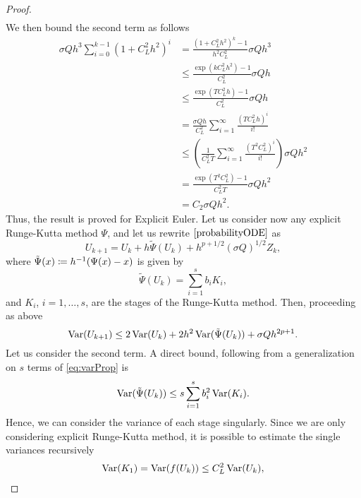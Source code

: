\begin{proof}
\begin{equation}
\begin{aligned}
\end{aligned}
\end{equation}
We then bound the second term as follows
\begin{equation}\label{eq:boundOfSum}
\begin{aligned}
	\sigma Q h^3 \sum_{i = 0}^{k - 1}(1 + C_L^2h^2)^i &=  \frac{(1 + C_L^2h^2)^k - 1}{h^2C_L^2}\sigma Qh^3 \\
	&\leq  \frac{\exp(kC_L^2h^2) - 1}{C_L^2}\sigma Qh \\ 
	&\leq  \frac{\exp(TC_L^2h) - 1}{C_L^2}\sigma Qh \\
	&= \frac{\sigma Qh}{C_L^2} \sum_{i = 1}^{\infty} \frac{(TC_L^2h)^i}{i!} \\
	&\leq \left(\frac{1}{C_L^2T} \sum_{i = 1}^{\infty} \frac{(T^2C_L^2)^i}{i!}\right)\sigma Q h^2 \\
	&= \frac{\exp(T^2C_L^2) - 1}{C_L^2T} \sigma Q h^2 \\
	&= C_2 \sigma Q h^2.
\end{aligned}
\end{equation}
Thus, the result is proved for Explicit Euler. Let us consider now any explicit Runge-Kutta method $\Psi$, and let us rewrite $\eqref{probabilityODE}$ as
\begin{equation}
	U_{k+1} = U_k + h\tilde \Psi (U_k) + h^{p + 1/2} (\sigma Q)^{1/2} Z_k,
\end{equation}
where $\tilde\Psi(x) \coloneqq h^{-1}(\Psi(x) - x)$ is given by
\begin{equation}
	\tilde\Psi(U_k) = \sum_{i = 1}^{s} b_i K_i,
\end{equation} 
and $K_i$, $i = 1, \ldots, s$, are the stages of the Runge-Kutta method. Then, proceeding as above
\begin{equation}
	\operatorname{Var}(U_{k+1}) \leq 2\operatorname{Var}(U_k) + 2h^2 \operatorname{Var}(\tilde \Psi (U_k)) + \sigma Q h^{2p + 1}.
\end{equation}
Let us consider the second term. A direct bound, following from a generalization on $s$ terms of \eqref{eq:varProp} is
\begin{equation}\label{eq:temp}
	\operatorname{Var}(\tilde \Psi (U_k)) \leq s\sum_{i = 1}^{s} b_i^2 \operatorname{Var}(K_i).
\end{equation}
Hence, we can consider the variance of each stage singularly. Since we are only considering explicit Runge-Kutta method, it is possible to estimate the single variances recursively
\begin{equation}
	\begin{aligned}
		\Var(K_1) &= \Var(f(U_k)) \leq C_L^2 \Var(U_k), \\

\end{aligned}
\end{equation}
\end{proof}
